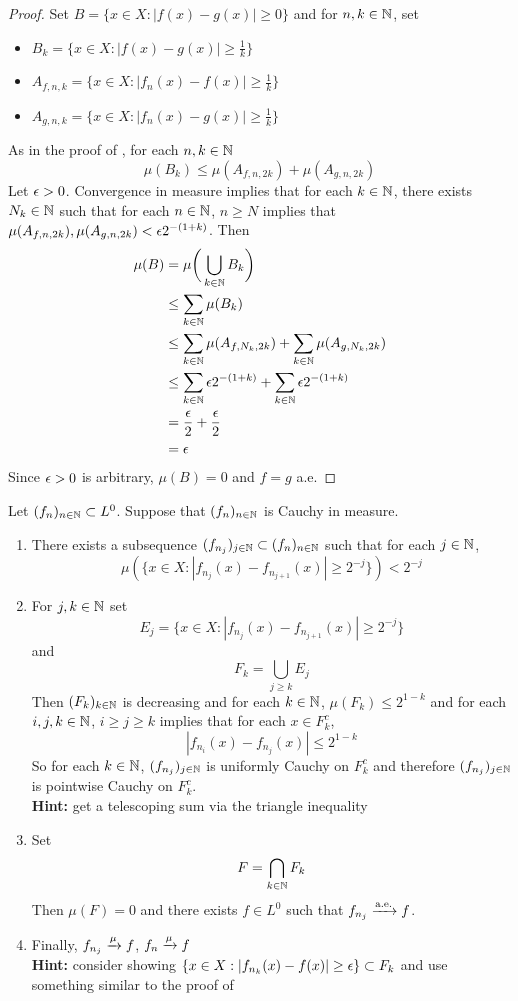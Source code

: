 \documentclass{book}
\begin{document}
	\begin{proof}
	Set $B = \{x \in X: |f(x) - g(x)|  \geq 0\}$ and for $n, k \in \mathbb{N}$, set 
	\begin{itemize}
	\item $B_k = \{x \in X: |f(x) - g(x)| \geq  \frac{1}{k}\}$
	\item $A_{f,n,k} = \{x \in X: |f_n(x) - f(x)| \geq  \frac{1}{k}\}$
	\item $A_{g,n,k} = \{x \in X: |f_n(x) - g(x)| \geq  \frac{1}{k}\}$
	\end{itemize} 
	As in the proof of , for each $n, k \in \mathbb{N}$
	$$\mu(B_k) \leq \mu(A_{f,n,2k}) + \mu(A_{g, n, 2k})$$ 
	Let $\epsilon >0$. Convergence in measure implies that for each $k \in \mathbb{N}$, there exists $N_k \in \mathbb{N}$ such that for each $n \in \mathbb{N}$, $n \geq N$ implies that $\mu(A_{f,n,2k}), \mu(A_{g,n,2k}) < \epsilon 2^{-(1+k)}$.
	Then 
	\begin{align*}
	\mu(B)
	&= \mu \bigg( \bigcup_{k \in \mathbb{N}} B_k \bigg) \\
	& \leq \sum_{k \in \mathbb{N}} \mu(B_k) \\
	& \leq  \sum_{k \in \mathbb{N}}\mu(A_{f,N_k,2k}) + \sum_{k \in \mathbb{N}}\mu(A_{g, N_k, 2k}) \\
	&\leq  \sum_{k \in \mathbb{N}} \epsilon 2^{-(1+k)} + \sum_{k \in \mathbb{N}} \epsilon 2^{-(1+k)} \\
	&= \frac{\epsilon}{2} + \frac{\epsilon}{2} \\
	&= \epsilon
\end{align*}	 
	Since $\epsilon >0$ is arbitrary, $\mu(B) = 0$ and $f = g$ a.e.
	\end{proof}
	
	\begin{ex}  
		Let $(f_n)_{n \in \mathbb{N}} \subset L^0$. Suppose that $(f_n)_{n \in \mathbb{N}}$ is Cauchy in measure. 
		\begin{enumerate}
		\item There exists a subsequence $(f_{n_j})_{j \in \mathbb{N}} \subset (f_n)_{n \in \mathbb{N}}$ such that for each $j \in \mathbb{N}$, $$\mu(\{x \in X: |f_{n_j}(x) - f_{n_{j+1}}(x)| \geq 2^{-j}\}) < 2^{-j}$$
		\item For $j,k \in \mathbb{N}$ set 
		$$E_j = \{x \in X: |f_{n_j}(x) - f_{n_{j+1}}(x)| \geq 2^{-j}\}$$
		and 
		$$F_k = \bigcup_{j \geq k}E_j$$
		Then $(F_k)_{k \in \mathbb{N}}$ is decreasing and for each $k \in \mathbb{N}$, $\mu(F_k) \leq 2^{1-k}$ and for each $i, j, k \in \mathbb{N}$, $i \geq j \geq k$ implies that for each $x \in F_k^c$, $$|f_{n_i}(x) - f_{n_j}(x)| \leq 2^{1-k}$$ 
		So for each $k \in \mathbb{N}$, $(f_{n_j})_{j \in \mathbb{N}}$  is uniformly Cauchy on $F_k^c$ and therefore $(f_{n_j})_{j \in \mathbb{N}}$  is pointwise Cauchy on $F_k^c$. \\
		\textbf{Hint:} get a telescoping sum via the triangle inequality 
		\item Set $$F = \bigcap_{k \in \mathbb{N}} F_k$$ 
		Then $\mu(F) = 0$ and there exists $f \in L^0$ such that $f_{n_j} \xrightarrow{\text{a.e.}} f$.  
		\item Finally, $f_{n_j} \xrightarrow{\mu} f$, $f_n \xrightarrow{\mu} f$ \\
		\textbf{Hint:} consider showing $\{x \in X: |f_{n_k}(x) - f(x)| \geq \epsilon\} \subset F_k$ and use something similar to the proof of 
		\end{enumerate}  
	\end{ex}
	
\end{document}
